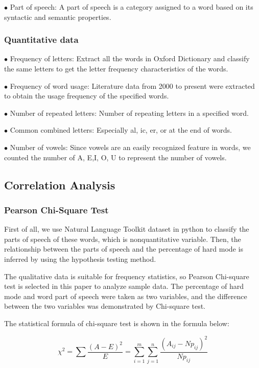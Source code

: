 \documentclass[
  journal=medium,
  manuscript=Report,
  year=2023,
  volume=37,
]{cup-journal}
\begin{document}
$\bullet$ Part of speech: A part of speech is a category assigned to a word based on its syntactic and semantic properties. 

\subsubsection{Quantitative data}

$\bullet$ Frequency of letters: Extract all the words in Oxford Dictionary and classify the same letters to get the letter frequency characteristics of the words. 

$\bullet$ Frequency of word usage: Literature data from 2000 to present were extracted to obtain the usage frequency of the specified words. 

$\bullet$ Number of repeated letters: Number of repeating letters in a specified word. 

$\bullet$ Common combined letters: Especially al, ic, er, or at the end of words. 

$\bullet$ Number of vowels: Since vowels are an easily recognized feature in words, we counted the number of A, E,I, O, U to represent the number of vowels. 

\subsection{Correlation Analysis}

\subsubsection{Pearson Chi-Square Test}

First of all, we use Natural Language Toolkit dataset in python to classify the parts of speech of these words, which is nonquantitative variable. Then, the relationship between the parts of speech and the percentage of hard mode is inferred by using the hypothesis testing method. 

The qualitative data is suitable for frequency statistics, so Pearson Chi-square test is selected in this paper to analyze sample data. The percentage of hard mode and word part of speech were taken as two variables, and the difference between the two variables was demonstrated by Chi-square test. 

The statistical formula of chi-square test is shown in the formula below: 

$$\chi^2 = \sum \frac{(A-E)^2}{E} = \sum^m_{i=1}\sum^n_{j=1}\frac{(A_{ij}-Np_{ij})^2}{Np_{ij}}$$
\end{document}
